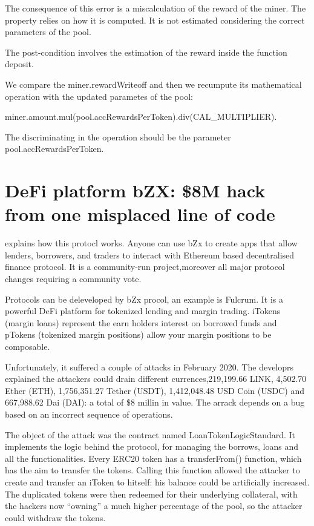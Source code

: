 The consequence of this error is a miscalculation of the reward of the miner.
The property relies on how it is computed. It is not estimated considering the correct parameters of the pool. 

The post-condition involves the estimation of the reward inside the function deposit.

We compare the miner.rewardWriteoff and then we recumpute its mathematical operation with the updated parametes 
of the pool: 

miner.amount.mul(pool.accRewardsPerToken).div(CAL\_MULTIPLIER).

The discriminating in the operation should be the parameter pool.accRewardsPerToken.


 

\section{DeFi platform bZX: \$8M hack from one misplaced line of code}
\label{sec:Exploits:bZX}

\citet{bZxProtocol} explains how this protocl works. 
Anyone can use bZx to create apps that allow lenders, borrowers, and traders to interact with Ethereum based 
decentralised finance protocol.
It is a community-run project,moreover all major protocol changes requiring a community vote. 

Protocols can be deleveloped by bZx procol, an example is Fulcrum. 
It is a powerful DeFi platform for tokenized lending and margin trading. 
iTokens (margin loans) represent the earn holders interest on borrowed funds and pTokens (tokenized margin positions) allow your margin positions to be composable.

Unfortunately, it suffered a couple of attacks in February 2020.
The developrs explained the attackers could drain different currences,219,199.66 LINK, 4,502.70 Ether (ETH), 1,756,351.27 Tether (USDT), 
1,412,048.48 USD Coin (USDC) and 667,988.62 Dai (DAI): a total of \$8 millin in value. 
The arrack depends on a bug based on an incorrect sequence of operations.

The object of the attack was the contract named LoanTokenLogicStandard.
It implements the logic behind the protocol, for managing the borrows, loans and all the functionalities.
Every ERC20 token has a transferFrom() function, which has the aim to transfer the tokens.
Calling this function allowed the attacker to create and transfer an iToken to hitself: his balance could be artificially increased.
The duplicated tokens were then redeemed for their underlying collateral, 
with the hackers now “owning” a much higher percentage of the pool, so the attacker could withdraw the tokens.

